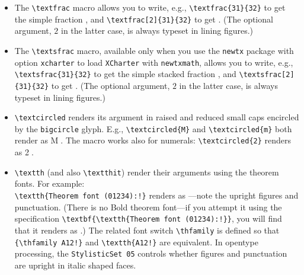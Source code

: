 \documentclass[11pt]{article}
\begin{document}
\begin{itemize}
\item The \verb|\textfrac| macro allows you to write, e.g.,  \verb|\textfrac{31}{32}| to get the simple fraction , and \verb|\textfrac[2]{31}{32}| to get . (The optional argument, $2$ in the latter case, is always typeset in lining figures.)
\item The \verb|\textsfrac| macro, available only when you use the {\tt newtx} package with option {\tt xcharter} to load {\tt XCharter} with {\tt newtxmath}, allows you to write, e.g.,  \verb|\textsfrac{31}{32}| to get the simple stacked fraction 
\iftutex
{},\fi
 and \verb|\textsfrac[2]{31}{32}| 
 \iftutex
 to get \fi%
 . (The optional argument, $2$ in the latter case, is always typeset in lining figures.)

\item \verb|\textcircled| renders its argument in raised and reduced small caps encircled by the {\tt bigcircle} glyph. E.g., \verb|\textcircled{M}| and \verb|\textcircled{m}| both render as \textcircled{M}. The macro works also for numerals: \verb|\textcircled{2}| renders as \textcircled{2}.
\item \verb|\textth| (and also \verb|\textthit|) render their arguments using the theorem fonts. For example:\\ 
\verb|\textth{Theorem font (01234):!}| renders as ---note the upright figures and punctuation. (There is no Bold theorem font---if you attempt it using the specification \verb|\textbf{\textth{Theorem font (01234):!}}|, you will find that it renders as \textbf{}.) The related font switch \verb|\thfamily| is defined so that \verb|{\thfamily A12!}| and \verb|\textth{A12!}| are equivalent.  In opentype processing, the {\tt StylisticSet 05} controls whether  figures and punctuation are upright in italic shaped faces.

\end{itemize}

\def\testupgreek{%
  \test\Gamma \test\Delta 
  \test\Theta \test\Lambda \test\Xi \test\Pi \test\Sigma
  \test\Upsilon \test\Phi \test\Psi \test\Omega }
\end{document}
